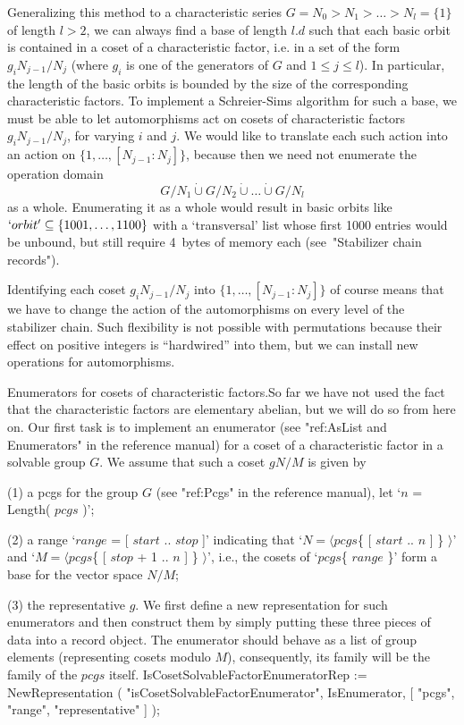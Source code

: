 Generalizing this method to a characteristic series $G=N_0 > N_1 > \ldots
> N_l=\{1\}$ of length $l>2$, we  can always find  a base of length $l.d$
such that each  basic orbit is  contained in a  coset of a characteristic
factor, i.e. in a set of the form $g_iN_{j-1}/N_j$ (where $g_i$ is one of
the generators  of $G$ and $1\le j\le  l$). In particular, the  length of
the basic  orbits   is  bounded   by  the  size  of    the  corresponding
characteristic factors. To implement a Schreier-Sims algorithm for such a
base, we  must  be   able  to  let   automorphisms  act  on   cosets   of
characteristic  factors $g_iN_{j-1}/N_j$, for  varying  $i$  and $j$.  We
would    like to    translate each such     action  into  an  action   on
$\{1,\ldots,[N_{j-1}\mathbin: N_j]\}$, because then we need not enumerate
the operation domain
$$
   G/N_1 \mathbin{\dot\cup} G/N_2 \mathbin{\dot\cup} \ldots
         \mathbin{\dot\cup} G/N_l $$
as a whole. Enumerating it  as a whole would result  in basic orbits like
$`orbit'\subseteq \{1001,\ldots,1100\}$  with a  `transversal' list whose
first 1000 entries would be unbound, but  still require 4~bytes of memory
each (see~"Stabilizer chain records").

Identifying   each  coset   $g_iN_{j-1}/N_j$ into   $\{1,\ldots, [N_{j-1}
\mathbin: N_j]\}$ of  course means that we have  to change the action  of
the automorphisms on     every  level of   the  stabilizer   chain.  Such
flexibility is not   possible with permutations  because their  effect on
positive  integers  is ``hardwired''  into them,  but  we can install new
operations for automorphisms.

{\bsf Enumerators for cosets of  characteristic factors.}\quad So far  we
have  not used the  fact that  the characteristic  factors are elementary
abelian, but we will do so from  here on. Our  first task is to implement
an enumerator (see "ref:AsList and  Enumerators" in the reference manual)
for a coset of a characteristic factor in a solvable group $G$. We assume
that such a coset $gN/M$ is given by
\beginlist
\item{(1)}  a pcgs for  the group  $G$ (see  "ref:Pcgs" in the  reference
  manual), let `$n$ = Length( $pcgs$ )';
\item{(2)} a range `$range$ = [ $start$  .. $stop$ ]' indicating that `$N
  =  \langle pcgs$\{ [ $start$  .. $n$ ] \} $\rangle$'  and `$M = \langle
  pcgs$\{  [  $stop$ + 1   .. $n$ ]  \} $\rangle$',  i.e.,  the cosets of
  `$pcgs$\{ $range$ \}' form a base for the vector space $N/M$;
\item{(3)} the representative $g$.
\endlist
We   first  define a  new representation  for   such enumerators and then
construct them by simply putting these three pieces of data into a record
object. The  enumerator  should  behave as  a   list of  group   elements
(representing cosets modulo $M$),   consequently, its family will  be the
family of the $pcgs$ itself.
\begintt
IsCosetSolvableFactorEnumeratorRep := NewRepresentation
    ( "isCosetSolvableFactorEnumerator", IsEnumerator,
                                [ "pcgs", "range", "representative" ] );

